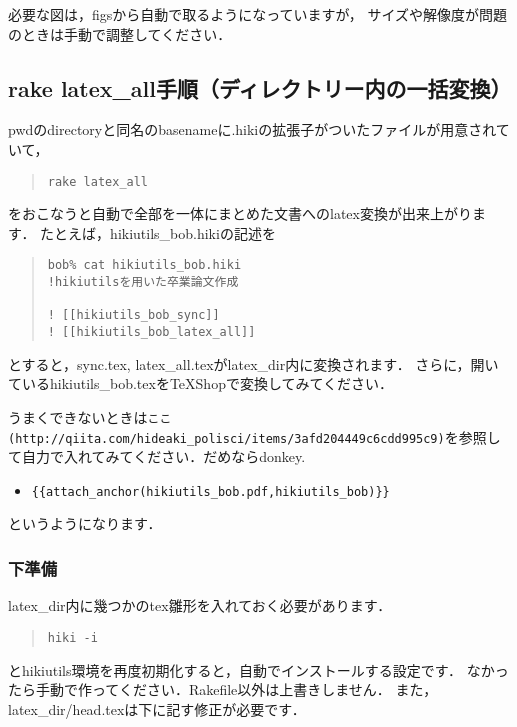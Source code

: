 必要な図は，figsから自動で取るようになっていますが，
サイズや解像度が問題のときは手動で調整してください．

\subsection{rake latex\_all手順（ディレクトリー内の一括変換）}
pwdのdirectoryと同名のbasenameに.hikiの拡張子がついたファイルが用意されていて，
\begin{quote}\begin{verbatim}
rake latex_all
\end{verbatim}\end{quote}
をおこなうと自動で全部を一体にまとめた文書へのlatex変換が出来上がります．
たとえば，hikiutils\_bob.hikiの記述を
\begin{quote}\begin{verbatim}
bob% cat hikiutils_bob.hiki 
!hikiutilsを用いた卒業論文作成

! [[hikiutils_bob_sync]]
! [[hikiutils_bob_latex_all]]

\end{verbatim}\end{quote}
とすると，sync.tex, latex\_all.texがlatex\_dir内に変換されます．
さらに，開いているhikiutils\_bob.texをTeXShopで変換してみてください．

うまくできないときは\verb|ここ(http://qiita.com/hideaki_polisci/items/3afd204449c6cdd995c9)|を参照して自力で入れてみてください．だめならdonkey.

\begin{itemize}
\item \verb|{{attach_anchor(hikiutils_bob.pdf,hikiutils_bob)}}|
\end{itemize}
というようになります．

\subsubsection{下準備}
latex\_dir内に幾つかのtex雛形を入れておく必要があります．
\begin{quote}\begin{verbatim}
hiki -i
\end{verbatim}\end{quote}
とhikiutils環境を再度初期化すると，自動でインストールする設定です．
なかったら手動で作ってください．Rakefile以外は上書きしません．
また，latex\_dir/head.texは下に記す修正が必要です．

